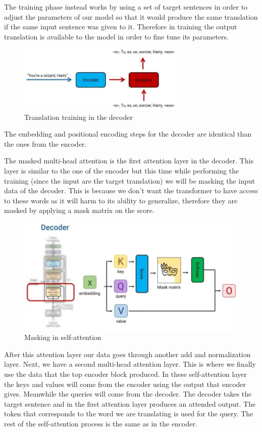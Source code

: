 The training phase instead works by using a set of target sentences in order to adjust the parameters of our model so that it would produce the same translation if the same input sentence was given to it. Therefore in training the output translation is available to the model in order to fine tune its parameters.

\begin{figure}[h]
    \centering
    \includegraphics[width=8cm]{Images/translation.jpg}
    \caption{Translation training in the decoder}
\end{figure}

\noindent The embedding and positional encoding steps for the decoder are identical than the ones from the encoder.

\noindent The masked multi-head attention is the first attention layer in the decoder. This layer is similar to the one of the encoder but this time while performing the training (since the input are the target translation) we will be masking the input data of the decoder. This is because we don’t want the transformer to have access to these words as it will harm to its ability to generalize, therefore they are masked by applying a mask matrix on the score.

\begin{figure}[h]
    \centering
    \includegraphics[width=13cm]{Images/masking-decoder.jpg}
    \caption{Masking in self-attention}
\end{figure}

\noindent After this attention layer our data goes through another add and normalization layer. Next, we have a second multi-head attention layer. This is where we finally use the data that the top encoder block produced. In these self-attention layer the keys and values will come from the encoder using the output that encoder gives. Meanwhile the queries will come from the decoder. The decoder takes the target sentence and in the first attention layer produces an attended output. The token that corresponds to the word we are translating is used for the query. The rest of the self-attention process is the same as in the encoder.


